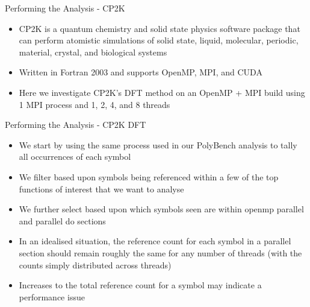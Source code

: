 \documentclass[final]{beamer}
\let\olditem\item
\renewcommand{\item}{\vspace{\fill}\olditem}
\begin{document}
\begin{frame}{\hspace{0.02\paperwidth}Performing the Analysis - CP2K}
\begin{itemize}
\item CP2K is a quantum chemistry and solid state physics software package that can perform atomistic simulations of solid state, liquid, molecular, periodic, material, crystal, and biological systems
\item Written in Fortran 2003 and supports OpenMP, \acs{MPI}, and CUDA
\item Here we investigate CP2K's \ac{DFT} method on an OpenMP + \acs{MPI} build using 1 \acs{MPI} process and 1, 2, 4, and 8 threads
\end{itemize}
\end{frame}

\begin{frame}{\hspace{0.02\paperwidth}Performing the Analysis - CP2K DFT}
\begin{itemize}
\item We start by using the same process used in our PolyBench analysis to tally all occurrences of each symbol
\item We filter based upon symbols being referenced within a few of the top functions of interest that we want to analyse
\item We further select based upon which symbols seen are within openmp parallel and parallel do sections
\item In an idealised situation, the reference count for each symbol in a parallel section should remain roughly the same for any number of threads (with the counts simply distributed across threads)
\item Increases to the total reference count for a symbol may indicate a performance issue
\end{itemize}
\end{frame}
\end{document}
